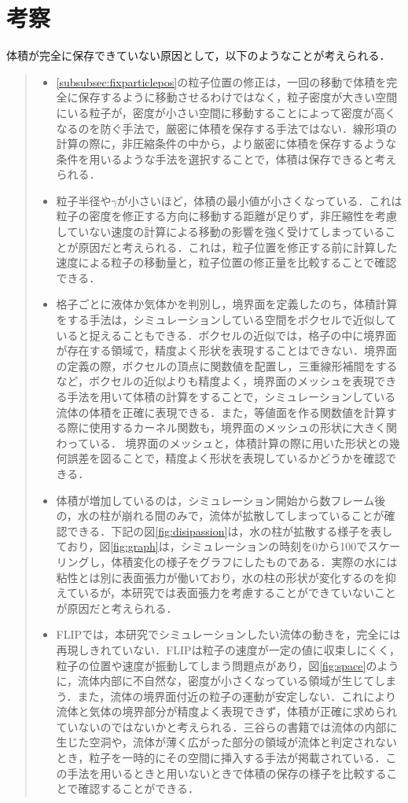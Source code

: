 \documentclass[a4j,12pt]{jreport}
\begin{document}
\section{考察} \label{sec:exp_consideration}
体積が完全に保存できていない原因として，以下のようなことが考えられる．
\begin{quote}
	\begin{itemize}
		\item \ref{subsubsec:fixparticlepos}の粒子位置の修正は，一回の移動で体積を完全に保存するように移動させるわけではなく，粒子密度が大きい空間にいる粒子が，密度が小さい空間に移動することによって密度が高くなるのを防ぐ手法で，厳密に体積を保存する手法ではない．線形項の計算の際に，非圧縮条件の中から，より厳密に体積を保存するような条件を用いるような手法を選択することで，体積は保存できると考えられる．
		\item 粒子半径や$\gamma$が小さいほど，体積の最小値が小さくなっている．これは粒子の密度を修正する方向に移動する距離が足りず，非圧縮性を考慮していない速度の計算による移動の影響を強く受けてしまっていることが原因だと考えられる．これは，粒子位置を修正する前に計算した速度による粒子の移動量と，粒子位置の修正量を比較することで確認できる．
		\item 格子ごとに液体か気体かを判別し，境界面を定義したのち，体積計算をする手法は，シミュレーションしている空間をボクセルで近似していると捉えることもできる．ボクセルの近似では，格子の中に境界面が存在する領域で，精度よく形状を表現することはできない．境界面の定義の際，ボクセルの頂点に関数値を配置し，三重線形補間をするなど，ボクセルの近似よりも精度よく，境界面のメッシュを表現できる手法を用いて体積の計算をすることで，シミュレーションしている流体の体積を正確に表現できる．また，等値面を作る関数値を計算する際に使用するカーネル関数も，境界面のメッシュの形状に大きく関わっている．
境界面のメッシュと，体積計算の際に用いた形状との幾何誤差を図ることで，精度よく形状を表現しているかどうかを確認できる．		\item 体積が増加しているのは，シミュレーション開始から数フレーム後の，水の柱が崩れる間のみで，流体が拡散してしまっていることが確認できる．下記の図\ref{fig:disipassion}は，水の柱が拡散する様子を表しており，図\ref{fig:graph}は，シミュレーションの時刻を0から100でスケーリングし，体積変化の様子をグラフにしたものである．実際の水には粘性とは別に表面張力が働いており，水の柱の形状が変化するのを抑えているが，本研究では表面張力を考慮することができていないことが原因だと考えられる．
		\item FLIPでは，本研究でシミュレーションしたい流体の動きを，完全には再現しきれていない．FLIPは粒子の速度が一定の値に収束しにくく，粒子の位置や速度が振動してしまう問題点があり，図\ref{fig:space}のように，流体内部に不自然な，密度が小さくなっている領域が生じてしまう．また，流体の境界面付近の粒子の運動が安定しない．これにより流体と気体の境界部分が精度よく表現できず，体積が正確に求められていないのではないかと考えられる．三谷らの書籍\cite{book}では流体の内部に生じた空洞や，流体が薄く広がった部分の領域が流体と判定されないとき，粒子を一時的にその空間に挿入する手法が掲載されている．この手法を用いるときと用いないときで体積の保存の様子を比較することで確認することができる．
	\end{itemize}
\end{quote}
\end{document}
